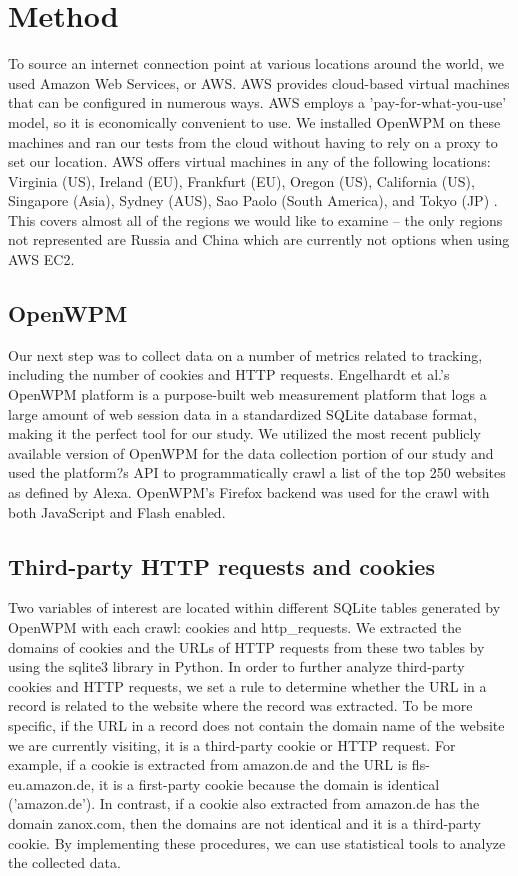 \documentclass[conference]{IEEEtran}
\begin{document}
\section{Method}

To source an internet connection point at various locations around the world, we used Amazon Web Services, or AWS. AWS provides cloud-based virtual machines that can be configured in numerous ways. AWS employs a 'pay-for-what-you-use' model, so it is economically convenient to use. We installed OpenWPM on these machines and ran our tests from the cloud without having to rely on a proxy to set our location. AWS offers virtual machines in any of the following locations: Virginia (US), Ireland (EU), Frankfurt (EU), Oregon (US), California (US), Singapore (Asia), Sydney (AUS), Sao Paolo (South America), and Tokyo (JP) \cite{amazonregion}. This covers almost all of the regions we would like to examine -- the only regions not represented are Russia and China which are currently not options when using AWS EC2.


\subsection{OpenWPM}

Our next step was to collect data on a number of metrics related to tracking, including the number of cookies and HTTP requests. Engelhardt et al.'s OpenWPM platform is a purpose-built web measurement platform that logs a large amount of web session data in a standardized SQLite database format, making it the perfect tool for our study. We utilized the most recent publicly available version of OpenWPM for the data collection portion of our study and used the platform?s API to programmatically crawl a list of the top 250 websites as defined by Alexa\cite{Alexa}. OpenWPM's Firefox backend was used for the crawl with both JavaScript and Flash enabled.


\subsection{Third-party HTTP requests and cookies}

Two variables of interest are located within different SQLite tables generated by OpenWPM with each crawl: cookies and http\_requests. We extracted the domains of cookies and the URLs of HTTP requests from these two tables by using the sqlite3 library in Python. In order to further analyze third-party cookies and HTTP requests, we set a rule to determine whether the URL in a record is related to the website where the record was extracted. To be more specific, if the URL in a record does not contain the domain name of the website we are currently visiting, it is a third-party cookie or HTTP request. For example, if a cookie is extracted from amazon.de and the URL is fls-eu.amazon.de, it is a first-party cookie because the domain is identical ('amazon.de'). In contrast, if a cookie also extracted from amazon.de has the domain zanox.com, then the domains are not identical and it is a third-party cookie. By implementing these procedures, we can use statistical tools to analyze the collected data.
\end{document}
